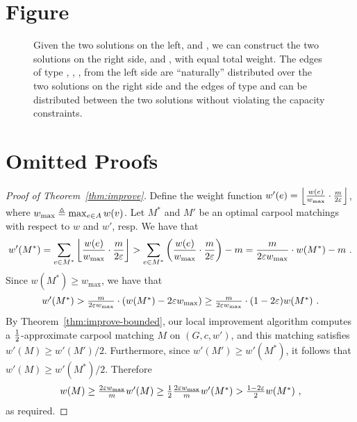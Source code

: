 
\newpage

\section{Figure}

\begin{figure}[h]
\centering

\caption[]{%
Given the two solutions on the left, 
 and , we
can construct the two solutions on the right side,
 and , with equal total weight.
The edges of type 
, 
, 
, 
from the left side are ``naturally'' distributed over the two solutions on the
right side and the edges of type  and  can be
distributed between the two solutions without violating the capacity constraints.
}
\label{fig:sub}
\end{figure}



\section{Omitted Proofs}
\label{sec:omitted}

\begin{proof}[Proof of Theorem~\ref{thm:improve}]
Define the weight function $w'(e)
= \left\lfloor \frac{w(e)}{w_{\max}} \cdot \frac{m}{2\varepsilon} \right\rfloor$, where
$w_{\max} \triangleq \max_{e \in A} w(v)$.
%
Let $M^*$ and $M'$ be an optimal carpool matchings with respect to $w$
and $w'$, resp.  We have that
\[
w'(M^*)
=    \sum_{e \in M^*} \left\lfloor \frac{w(e)}{w_{\max}} \cdot \frac{m}{2\varepsilon} \right\rfloor
>    \sum_{e \in M^*} \left(  \frac{w(e)}{w_{\max}} \cdot \frac{m}{2\varepsilon}  \right) - m
=    \frac{m}{2\varepsilon w_{\max}} \cdot w(M^*) - m
~.
\]
Since $w(M^*) \geq w_{\max}$, we have that 
\[
\textstyle
w'(M^*)
>    \frac{m}{2\varepsilon w_{\max}} \cdot (w(M^*) - 2\varepsilon w_{\max})
\geq \frac{m}{2\varepsilon w_{\max}} \cdot (1 - 2\varepsilon) w(M^*)
~.
\]
By Theorem~\ref{thm:improve-bounded}, our local improvement algorithm computes a
$\frac{1}{2}$-approximate carpool matching $M$ on $(G, c, w')$, and this
matching satisfies $w'(M) \geq w'(M')/2$.  Furthermore, since
$w'(M') \geq w'(M^*)$, it follows that $w'(M) \geq w'(M^*)/2$.
Therefore
\[
\textstyle
w(M)
\geq \frac{2\varepsilon w_{\max}}{m} w'(M) 
\geq \frac{1}{2} \frac{2\varepsilon w_{\max}}{m} w'(M^*)
>    \frac{1-2\varepsilon}{2} w(M^*)
~,
\]
as required.
\end{proof}

